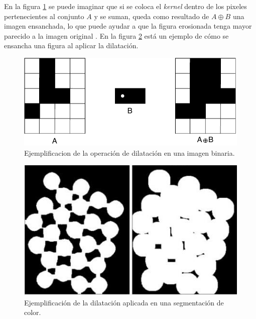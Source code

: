 En la figura \ref{fig:dilation_diagram} se puede imaginar que si se coloca el \textit{kernel} dentro de los pixeles pertenecientes al conjunto $A$ y se suman, queda como resultado de $A \oplus B$ una imagen ensanchada, lo que puede ayudar a que la figura erosionada tenga mayor parecido a la imagen original \cite{4767941}. En la figura \ref{fig:dilation_example} está un ejemplo de cómo se ensancha una figura al aplicar la dilatación.

\begin{figure}
\centering
\includegraphics[scale=1]{images/dilation_diagram.pdf}
\caption{Ejemplificacion de la operación de dilatación en una imagen binaria.}
\label{fig:dilation_diagram}
\end{figure}

\begin{figure}
\centering
\includegraphics[scale=0.7]{images/dilation_example.jpg}
\caption{Ejemplificación de la dilatación aplicada en una segmentación de color.}
\label{fig:dilation_example}
\end{figure}